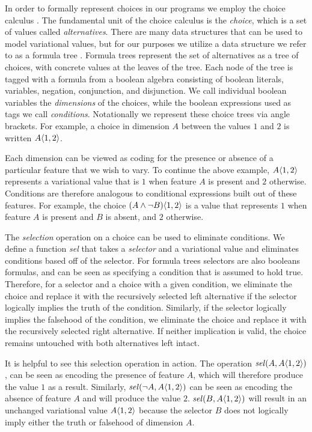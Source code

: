 \documentclass[12pt,oneside]{book}
\begin{document}
In order to formally represent choices in our programs we employ the choice
calculus \cite{Walk13thesis,EW11tosem}. The fundamental unit of the choice calculus is
the \emph{choice}, which is a set of values called \emph{alternatives}.
There are many data structures that can be used to model
variational values, but for our purposes we utilize a data structure we refer
to as a formula tree \cite{Walk14onward,WO14gpce}.
Formula trees represent the set of alternatives as a tree of choices, with concrete
values at the leaves of the tree. Each node of the tree is tagged with a formula from a boolean
algebra consisting of boolean literals, variables, negation, conjunction, and disjunction. We call individual
boolean variables the \emph{dimensions} of the choices, while the boolean expressions used as tags we call \emph{conditions}. Notationally we represent these choice trees
via angle brackets. For example, a choice in dimension $A$
between the values $1$ and $2$ is written $A \langle 1, 2 \rangle$.

Each dimension can be viewed as coding for the presence or absence of a
particular feature that we wish to vary. To continue the above example, $A \langle 1, 2 \rangle$
represents a variational value that is $1$ when feature $A$ is present and $2$ otherwise. Conditions
are therefore analogous to conditional expressions built out of these features. For example, the choice $(A \wedge \neg B) \langle 1, 2 \rangle$
is a value that represents $1$ when feature $A$ is present and $B$ is absent, and $2$ otherwise.

The \emph{selection} operation on a choice can be used to eliminate conditions. We define a function
\emph{sel} that takes a \emph{selector} and a variational value and eliminates conditions based off
of the selector. For formula trees selectors are also booleans formulas, and can be seen as specifying
a condition that is assumed to hold true. Therefore, for a
selector and a choice with a given condition, we eliminate the choice and replace it with the recursively selected left alternative if the selector logically implies
the truth of the condition. Similarly, if the selector logically implies the falsehood of the condition, we eliminate the choice
and replace it with the recursively selected right alternative. If neither implication is valid, the choice remains untouched with
both alternatives left intact.

It is helpful to see this selection operation in action. The operation
$\mathit{sel}(A,A \langle 1, 2 \rangle)$, can be seen as encoding the presence of feature $A$, which
will therefore produce the value $1$ as a result. Similarly, $\mathit{sel}(\neg A,A \langle 1, 2 \rangle)$ can be seen as encoding the absence of feature $A$ and will
produce the value $2$. $\mathit{sel}(B,A \langle 1, 2 \rangle)$ will result in an unchanged variational
value $A \langle 1, 2 \rangle$ because the selector $B$ does not logically imply either the truth or falsehood
of dimension $A$.
\end{document}
